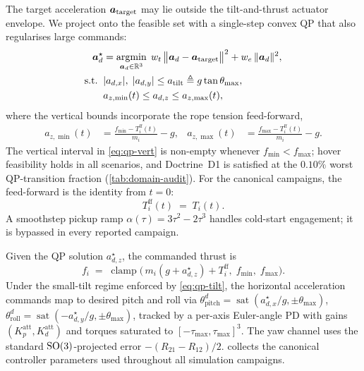 The target acceleration $\boldsymbol{a}_{\mathrm{target}}$ may lie outside the tilt-and-thrust actuator envelope. We project onto the feasible set with a single-step convex QP that also regularises large commands:
\begin{subequations}
\label{eq:qp}
\begin{align}
  \boldsymbol{a}_d^\star
    &= \operatorname*{argmin}_{\boldsymbol{a}_d \in \mathbb{R}^3}
      \; w_t\,\bigl\|\boldsymbol{a}_d - \boldsymbol{a}_{\mathrm{target}}\bigr\|^2
      + w_e\,\|\boldsymbol{a}_d\|^2,
    \label{eq:qp-cost} \\
  \text{s.t.}\;\;
    &\lvert a_{d,x} \rvert,\;\lvert a_{d,y} \rvert
      \le a_{\mathrm{tilt}} \triangleq g\tan\theta_{\max},
    \label{eq:qp-tilt} \\
    &a_{z,\min}(t) \le a_{d,z} \le a_{z,\max}(t),
    \label{eq:qp-vert}
\end{align}
\end{subequations}
where the vertical bounds incorporate the rope tension feed-forward,
\begin{align}
\label{eq:az-bounds}
  a_{z,\min}(t) &= \frac{f_{\min} - T_i^{\mathrm{ff}}(t)}{m_i} - g,
  &
  a_{z,\max}(t) &= \frac{f_{\max} - T_i^{\mathrm{ff}}(t)}{m_i} - g.
\end{align}
The vertical interval in \eqref{eq:qp-vert} is non-empty whenever $f_{\min} < f_{\max}$; hover feasibility holds in all scenarios, and Doctrine~D1 is satisfied at the $0.10\%$ worst QP-transition fraction (\cref{tab:domain-audit}). For the canonical campaigns, the feed-forward is the identity from $t=0$:
\begin{equation}
  \boxed{T_i^{\mathrm{ff}}(t) \;=\; T_i(t).}
  \label{eq:Tff}
\end{equation}
A smoothstep pickup ramp $\alpha(\tau) = 3\tau^2 - 2\tau^3$ handles cold-start engagement; it is bypassed in every reported campaign.

Given the QP solution $a_{d,z}^\star$, the commanded thrust is
\begin{equation}
\label{eq:thrust}
  f_i \;=\; \operatorname{clamp}\!\bigl(\,
      m_i(g + a_{d,z}^\star) + T_i^{\mathrm{ff}},\;
      f_{\min},\; f_{\max}\bigr).
\end{equation}
Under the small-tilt regime enforced by \eqref{eq:qp-tilt}, the horizontal acceleration commands map to desired pitch and roll via $\theta^d_{\mathrm{pitch}}=\operatorname{sat}(a_{d,x}^\star/g,\pm\theta_{\max})$, $\theta^d_{\mathrm{roll}}=\operatorname{sat}(-a_{d,y}^\star/g,\pm\theta_{\max})$, tracked by a per-axis Euler-angle PD with gains $(K_p^{\mathrm{att}},K_d^{\mathrm{att}})$ and torques saturated to $[-\tau_{\max},\tau_{\max}]^3$. The yaw channel uses the standard $\mathrm{SO}(3)$-projected error $-(R_{21}-R_{12})/2$.  collects the canonical controller parameters used throughout all simulation campaigns.

